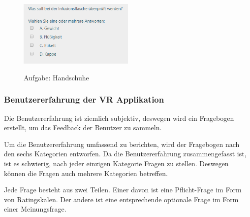 \begin{enumerate}
\begin{figure}[ht]
\vspace*{1em}
\centering
\caption{Aufgabe: Handschuhe}
\includegraphics[width= 0.5\textwidth]{images/Aufgabe5.png}
\label{fig:Aufgabe5} 
\end{figure}
    
\end{enumerate}

\subsubsection{Benutzererfahrung der VR Applikation}

Die Benutzererfahrung ist ziemlich subjektiv, deswegen wird ein Fragebogen erstellt, um das Feedback der Benutzer zu sammeln.

Um die Benutzererfahrung umfassend zu berichten, wird der Fragebogen nach den sechs Kategorien \citep{28} entworfen. Da die Benutzererfahrung zusammengefasst ist, ist es schwierig, nach jeder einzigen Kategorie Fragen zu stellen. Deswegen können die Fragen auch mehrere Kategorien betreffen.

Jede Frage besteht aus zwei Teilen. Einer davon ist eine Pflicht-Frage im Form von Ratingskalen. Der andere ist eine entsprechende optionale Frage im Form einer Meinungsfrage.

